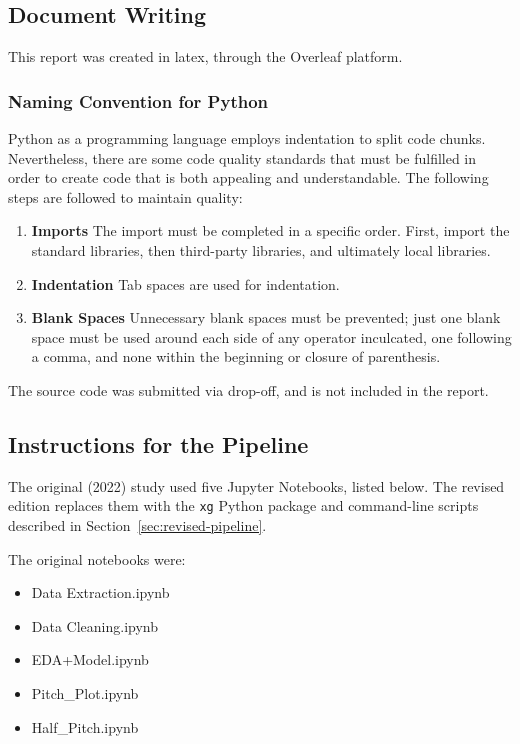 \subsection{Document Writing}
This report was created in latex, through the Overleaf platform.

\subsubsection{Naming Convention for Python}
Python as a programming language employs indentation to split code chunks. Nevertheless, there are some code quality standards that must be fulfilled in order to create code that is both appealing and understandable. The following steps are followed to maintain quality:
\begin{enumerate}
    \item \textbf{Imports}
    The import must be completed in a specific order. First, import the standard libraries, then third-party libraries, and ultimately local libraries. 
    \item \textbf{Indentation}
    Tab spaces are used for indentation.
    \item \textbf{Blank Spaces}
    Unnecessary blank spaces must be prevented; just one blank space must be used around each side of any operator inculcated, one following a comma, and none within the beginning or closure of parenthesis. 
\end{enumerate}

The source code was submitted via drop-off, and is not included in the report.

\subsection{Instructions for the Pipeline}

The original (2022) study used five Jupyter Notebooks, listed below. The revised edition replaces them with the \texttt{xg} Python package and command-line scripts described in Section~\ref{sec:revised-pipeline}.

The original notebooks were:

\begin{itemize}
    \item Data Extraction.ipynb
    \item Data Cleaning.ipynb
    \item EDA+Model.ipynb
    \item Pitch\_Plot.ipynb
    \item Half\_Pitch.ipynb
\end{itemize}

